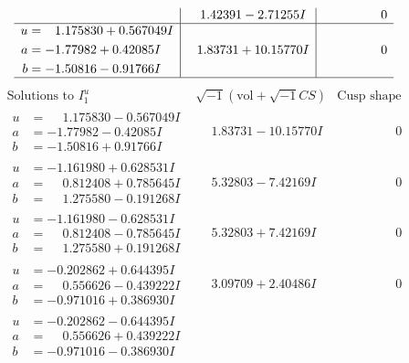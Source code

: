 \documentclass[1p]{elsarticle_modified}
\theoremstyle{definition}
\newcommand{\I}{\sqrt{-1}}
\begin{document}
$$\begin{array}{c|c|c}
 & \phantom{-}1.42391 - 2.71255 I & \phantom{-0.000000 } 0 \\ \hline\begin{aligned}
u &= \phantom{-}1.175830 + 0.567049 I \\
a &= -1.77982 + 0.42085 I \\
b &= -1.50816 - 0.91766 I\end{aligned}
 & \phantom{-}1.83731 + 10.15770 I & \phantom{-0.000000 } 0\\
 \hline 
 \end{array}$$\newpage$$\begin{array}{c|c|c}  
\text{Solutions to }I^u_{1}& \I (\text{vol} + \sqrt{-1}CS) & \text{Cusp shape}\\
 \hline 
\begin{aligned}
u &= \phantom{-}1.175830 - 0.567049 I \\
a &= -1.77982 - 0.42085 I \\
b &= -1.50816 + 0.91766 I\end{aligned}
 & \phantom{-}1.83731 - 10.15770 I & \phantom{-0.000000 } 0 \\ \hline\begin{aligned}
u &= -1.161980 + 0.628531 I \\
a &= \phantom{-}0.812408 + 0.785645 I \\
b &= \phantom{-}1.275580 - 0.191268 I\end{aligned}
 & \phantom{-}5.32803 - 7.42169 I & \phantom{-0.000000 } 0 \\ \hline\begin{aligned}
u &= -1.161980 - 0.628531 I \\
a &= \phantom{-}0.812408 - 0.785645 I \\
b &= \phantom{-}1.275580 + 0.191268 I\end{aligned}
 & \phantom{-}5.32803 + 7.42169 I & \phantom{-0.000000 } 0 \\ \hline\begin{aligned}
u &= -0.202862 + 0.644395 I \\
a &= \phantom{-}0.556626 - 0.439222 I \\
b &= -0.971016 + 0.386930 I\end{aligned}
 & \phantom{-}3.09709 + 2.40486 I & \phantom{-0.000000 } 0 \\ \hline\begin{aligned}
u &= -0.202862 - 0.644395 I \\
a &= \phantom{-}0.556626 + 0.439222 I \\
b &= -0.971016 - 0.386930 I\end{aligned}

\end{array}$$
\end{document}
